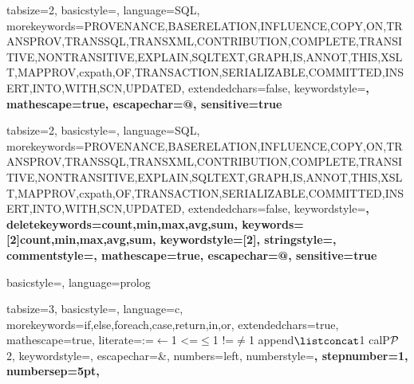 


{
tabsize=2,
basicstyle=\small\upshape\ttfamily,
language=SQL,
morekeywords={PROVENANCE,BASERELATION,INFLUENCE,COPY,ON,TRANSPROV,TRANSSQL,TRANSXML,CONTRIBUTION,COMPLETE,TRANSITIVE,NONTRANSITIVE,EXPLAIN,SQLTEXT,GRAPH,IS,ANNOT,THIS,XSLT,MAPPROV,cxpath,OF,TRANSACTION,SERIALIZABLE,COMMITTED,INSERT,INTO,WITH,SCN,UPDATED},
extendedchars=false,
keywordstyle=\bfseries,
mathescape=true,
escapechar=@,
sensitive=true
}


{
tabsize=2,
basicstyle=\small\upshape\ttfamily,
language=SQL,
morekeywords={PROVENANCE,BASERELATION,INFLUENCE,COPY,ON,TRANSPROV,TRANSSQL,TRANSXML,CONTRIBUTION,COMPLETE,TRANSITIVE,NONTRANSITIVE,EXPLAIN,SQLTEXT,GRAPH,IS,ANNOT,THIS,XSLT,MAPPROV,cxpath,OF,TRANSACTION,SERIALIZABLE,COMMITTED,INSERT,INTO,WITH,SCN,UPDATED},
extendedchars=false,
keywordstyle=\bfseries\color{lstpurple},
deletekeywords={count,min,max,avg,sum},
keywords=[2]{count,min,max,avg,sum},
keywordstyle=[2]\color{lstblue},
stringstyle=\color{lstreddark},
commentstyle=\color{lstgreen},
mathescape=true,
escapechar=@,
sensitive=true
}


{
basicstyle=\footnotesize\upshape\ttfamily,
language=prolog
}




{
  tabsize=3,
  basicstyle=\small,
  language=c,
  morekeywords={if,else,foreach,case,return,in,or},
  extendedchars=true,
  mathescape=true,
  literate={:=}{{$\gets$}}1 {<=}{{$\leq$}}1 {!=}{{$\neq$}}1 {append}{{$\listconcat$}}1 {calP}{{$\cal P$}}{2},
  keywordstyle=\color{lstpurple},
  escapechar=&,
  numbers=left,
  numberstyle=\color{lstgreen}\small\bfseries, 
  stepnumber=1, 
  numbersep=5pt,
}

